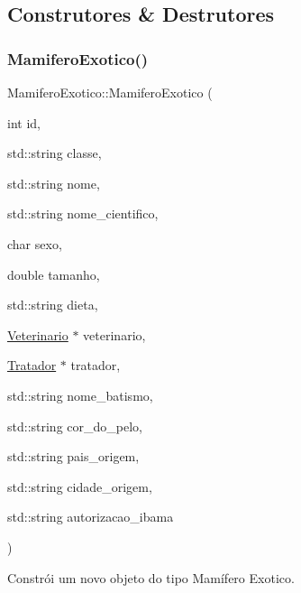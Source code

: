 \subsection{Construtores \& Destrutores}
\mbox{\label{classMamiferoExotico_a79b2b19d1c2de729de2b92c173521379}} 
\subsubsection{\texorpdfstring{Mamifero\+Exotico()}{MamiferoExotico()}\hspace{0.1cm}{\footnotesize\ttfamily [1/3]}}
{\footnotesize\ttfamily Mamifero\+Exotico\+::\+Mamifero\+Exotico (\begin{DoxyParamCaption}\item[{int}]{id,  }\item[{std\+::string}]{classe,  }\item[{std\+::string}]{nome,  }\item[{std\+::string}]{nome\+\_\+cientifico,  }\item[{char}]{sexo,  }\item[{double}]{tamanho,  }\item[{std\+::string}]{dieta,  }\item[{\hyperlink{classVeterinario}{Veterinario} $\ast$}]{veterinario,  }\item[{\hyperlink{classTratador}{Tratador} $\ast$}]{tratador,  }\item[{std\+::string}]{nome\+\_\+batismo,  }\item[{std\+::string}]{cor\+\_\+do\+\_\+pelo,  }\item[{std\+::string}]{pais\+\_\+origem,  }\item[{std\+::string}]{cidade\+\_\+origem,  }\item[{std\+::string}]{autorizacao\+\_\+ibama }\end{DoxyParamCaption})}



Constrói um novo objeto do tipo Mamífero Exotico. 


